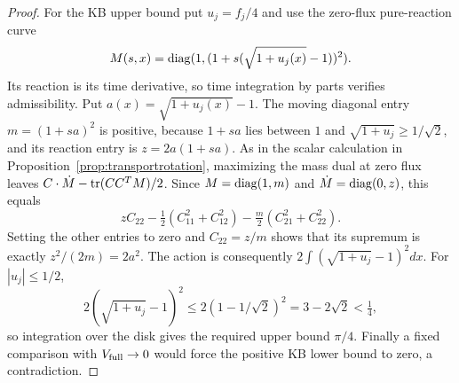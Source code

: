 \begin{proof}
For the KB upper bound put $u_j=f_j/4$ and use the zero-flux pure-reaction curve
\[
 M(s,x)=\operatorname{diag}(1,(1+s(\sqrt{1+u_j(x)}-1))^2).
\]
Its reaction is its time derivative, so time integration by parts verifies
admissibility. Put $a(x)=\sqrt{1+u_j(x)}-1$. The moving diagonal entry
$m=(1+sa)^2$ is positive, because $1+sa$ lies between $1$ and
$\sqrt{1+u_j}\ge1/\sqrt2$, and its reaction entry is $z=2a(1+sa)$.
As in the scalar calculation in Proposition~\ref{prop:transportrotation},
maximizing the mass dual at zero flux leaves
$C\cdot\dot M-\operatorname{tr}(CC^TM)/2$. Since $M=\operatorname{diag}(1,m)$ and
$\dot M=\operatorname{diag}(0,z)$, this equals
\[
 zC_{22}-\tfrac12(C_{11}^2+C_{12}^2)
              -\tfrac m2(C_{21}^2+C_{22}^2).
\]
Setting the other entries to zero and $C_{22}=z/m$ shows that its supremum
is exactly $z^2/(2m)=2a^2$. The action is consequently
$2\int(\sqrt{1+u_j}-1)^2dx$. For $|u_j|\le1/2$,
\[
 2(\sqrt{1+u_j}-1)^2
 \le2(1-1/\sqrt2)^2=3-2\sqrt2<\tfrac14,
\]
so integration over the disk gives the required upper bound $\pi/4$.
Finally a fixed comparison with $V_{\rm full}\to0$ would force the
positive KB lower bound to zero, a contradiction.
\end{proof}
